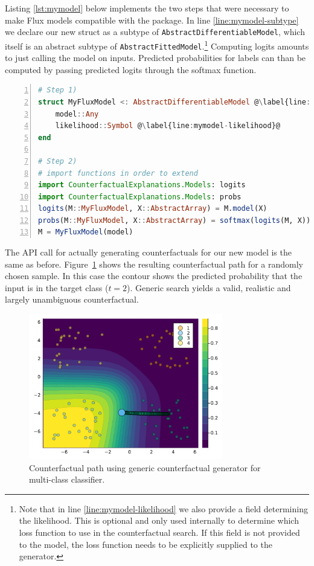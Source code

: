 \documentclass{juliacon}
\begin{document}
Listing \ref{lst:mymodel} below implements the two steps that were
necessary to make Flux models compatible with the package. In line
\ref{line:mymodel-subtype} we declare our new struct as a subtype of
\texttt{AbstractDifferentiableModel}, which itself is an abstract
subtype of \texttt{AbstractFittedModel}.\footnote{Note that in line
  \ref{line:mymodel-likelihood} we also provide a field determining the
  likelihood. This is optional and only used internally to determine
  which loss function to use in the counterfactual search. If this field
  is not provided to the model, the loss function needs to be explicitly
  supplied to the generator.} Computing logits amounts to just calling
the model on inputs. Predicted probabilities for labels can than be
computed by passing predicted logits through the softmax function.

\begin{lstlisting}[language=Julia, escapechar=@, numbers=left, label={lst:mymodel}, caption={}]
# Step 1)
struct MyFluxModel <: AbstractDifferentiableModel @\label{line:mymodel-subtype}@
    model::Any
    likelihood::Symbol @\label{line:mymodel-likelihood}@
end

# Step 2)
# import functions in order to extend
import CounterfactualExplanations.Models: logits
import CounterfactualExplanations.Models: probs 
logits(M::MyFluxModel, X::AbstractArray) = M.model(X)
probs(M::MyFluxModel, X::AbstractArray) = softmax(logits(M, X))
M = MyFluxModel(model)
\end{lstlisting}

The API call for actually generating counterfactuals for our new model
is the same as before. Figure~\ref{fig-multi} shows the resulting
counterfactual path for a randomly chosen sample. In this case the
contour shows the predicted probability that the input is in the target
class (\(t=2\)). Generic search yields a valid, realistic and largely
unambiguous counterfactual.

\begin{figure}

{\centering \includegraphics[width=3.33333in,height=2.5in]{www/ce_multi.png}

}

\caption{\label{fig-multi}Counterfactual path using generic
counterfactual generator for multi-class classifier.}

\end{figure}
\end{document}

